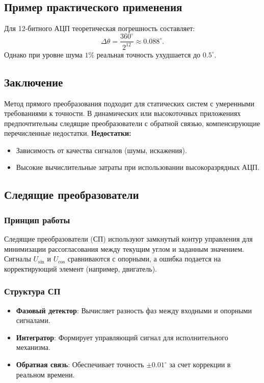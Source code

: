 \subsection{Пример практического применения}
Для 12-битного АЦП теоретическая погрешность составляет:
\[
\Delta\theta = \frac{360^\circ}{2^{12}} \approx 0.088^\circ.
\]
Однако при уровне шума \(1\%\) реальная точность ухудшается до \(0.5^\circ\).

\subsection{Заключение}
Метод прямого преобразования подходит для статических систем с умеренными требованиями к точности. В динамических или высокоточных приложениях предпочтительны следящие преобразователи с обратной связью, компенсирующие перечисленные недостатки.
\textbf{Недостатки:}
\begin{itemize}
    \item Зависимость от качества сигналов (шумы, искажения).
    \item Высокие вычислительные затраты при использовании высокоразрядных АЦП.
\end{itemize}

\subsection{Следящие преобразователи}
\subsubsection*{Принцип работы}
Следящие преобразователи (СП) используют замкнутый контур управления для минимизации рассогласования между текущим углом и заданным значением. Сигналы \(U_{\sin}\) и \(U_{\cos}\) сравниваются с опорными, а ошибка подается на корректирующий элемент (например, двигатель).

\subsubsection*{Структура СП}
\begin{itemize}
    \item \textbf{Фазовый детектор}: Вычисляет разность фаз между входными и опорными сигналами.
    \item \textbf{Интегратор}: Формирует управляющий сигнал для исполнительного механизма.
    \item \textbf{Обратная связь}: Обеспечивает точность \(\pm0.01^\circ\) за счет коррекции в реальном времени.
\end{itemize}

